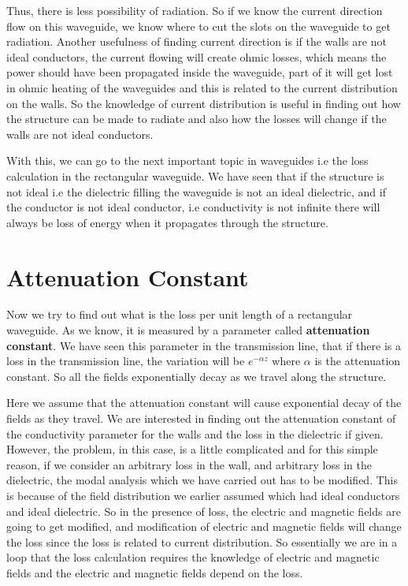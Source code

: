 Thus, there is less possibility of radiation. So if we know the current direction flow on this waveguide, we know where to cut the slots on the waveguide to get radiation. Another usefulness of finding current direction is if the walls are not ideal conductors, the current flowing will create ohmic losses, which means the power should have been propagated inside the waveguide, part of it will get lost in ohmic heating of the waveguides and this is related to the current distribution on the walls. So the knowledge of current distribution is useful in finding out how the structure can be made to radiate and also how the losses will change if the walls are not ideal conductors.
	
With this, we can go to the next important topic in waveguides i.e the loss calculation in the rectangular waveguide. We have seen that if the structure is not ideal i.e the dielectric filling the waveguide is not an ideal dielectric, and if the conductor is not ideal conductor, i.e conductivity is not infinite there will always be loss of energy when it propagates through the structure.

\section{Attenuation Constant}
Now we try to find out what is the loss per unit length of a rectangular waveguide. As we know, it is measured by a parameter called \textbf{attenuation constant}. We have seen this parameter in the transmission line, that if there is a loss in the transmission line, the variation will be $e^{-\alpha z}$ where $\alpha$ is the attenuation constant. So all the fields exponentially decay as we travel along the structure. 

Here we assume that the attenuation constant will cause exponential decay of the fields as they travel. We are interested in finding out the attenuation constant of the conductivity parameter for the walls and the loss in the dielectric if given. However, the problem, in this case, is a little complicated and for this simple reason, if we consider an arbitrary loss in the wall, and arbitrary loss in the dielectric, the modal analysis which we have carried out has to be modified. This is because of the field distribution we earlier assumed which had ideal conductors and ideal dielectric. So in the presence of loss, the electric and magnetic fields are going to get modified, and modification of electric and magnetic fields will change the loss since the loss is related to current distribution. So essentially we are in a loop that the loss calculation requires the knowledge of electric and magnetic fields and the electric and magnetic fields depend on the loss.
	
